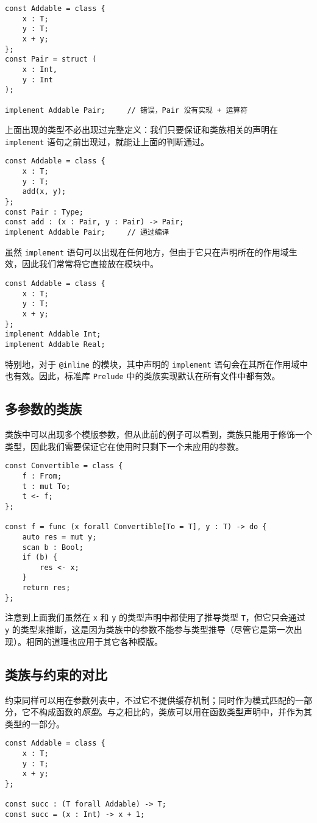 \begin{lstlisting}
const Addable = class {
	x : T;
	y : T;
	x + y;
};
const Pair = struct (
	x : Int,
	y : Int
);

implement Addable Pair;		// 错误，Pair 没有实现 + 运算符
\end{lstlisting}

上面出现的类型不必出现过完整定义：我们只要保证和类族相关的声明在 \lstinline!implement! 语句之前出现过，就能让上面的判断通过。

\begin{lstlisting}
const Addable = class {
	x : T;
	y : T;
	add(x, y);
};
const Pair : Type;
const add : (x : Pair, y : Pair) -> Pair;
implement Addable Pair;		// 通过编译
\end{lstlisting}

虽然 \lstinline!implement! 语句可以出现在任何地方，但由于它只在声明所在的作用域生效，因此我们常常将它直接放在模块中。

\begin{lstlisting}
const Addable = class {
	x : T;
	y : T;
	x + y;
};
implement Addable Int;
implement Addable Real;
\end{lstlisting}

特别地，对于 \lstinline!@inline! 的模块，其中声明的 \lstinline!implement! 语句会在其所在作用域中也有效。因此，标准库 \lstinline!Prelude! 中的类族实现默认在所有文件中都有效。

\subsection{多参数的类族}

类族中可以出现多个模版参数，但从此前的例子可以看到，类族只能用于修饰一个类型，因此我们需要保证它在使用时只剩下一个未应用的参数。

\begin{lstlisting}
const Convertible = class {
	f : From;
	t : mut To;
	t <- f;
};

const f = func (x forall Convertible[To = T], y : T) -> do {
	auto res = mut y;
	scan b : Bool;
	if (b) {
		res <- x;
	}
	return res;
};
\end{lstlisting}

注意到上面我们虽然在 \lstinline!x! 和 \lstinline!y! 的类型声明中都使用了推导类型 \lstinline!T!，但它只会通过 \lstinline!y! 的类型来推断，这是因为类族中的参数不能参与类型推导（尽管它是第一次出现）。相同的道理也应用于其它各种模版。

\subsection{类族与约束的对比}

约束同样可以用在参数列表中，不过它不提供缓存机制；同时作为模式匹配的一部分，它不构成函数的\emph{原型}。与之相比的，类族可以用在函数类型声明中，并作为其类型的一部分。

\begin{lstlisting}
const Addable = class {
	x : T;
	y : T;
	x + y;
};

const succ : (T forall Addable) -> T;
const succ = (x : Int) -> x + 1;
\end{lstlisting}

